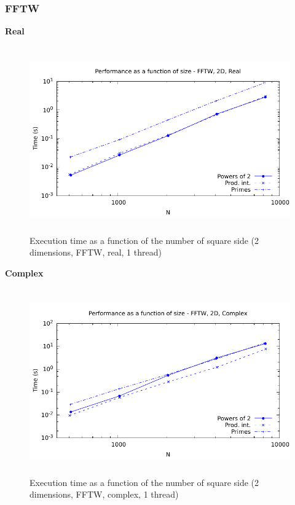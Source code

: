 \documentclass[12pt, a4paper]{article}
\begin{document}
\subsubsection{FFTW}
{\bf Real}
\begin{figure}[H]
\captionsetup{width=0.6\textwidth}
\centering
\includegraphics[height=8cm]{graphs/performance/2d-fftw-r.pdf}
\caption{Execution time as a function of the number of square side (2 dimensions, FFTW, real, 1 thread)}
\label{2DFFTWR}
\end{figure}
{\bf Complex}
\begin{figure}[H]
\captionsetup{width=0.6\textwidth}
\centering
\includegraphics[height=8cm]{graphs/performance/2d-fftw-c.pdf}
\caption{Execution time as a function of the number of square side (2 dimensions, FFTW, complex, 1 thread)}
\label{2DFFTWC}
\end{figure}   
\end{document}
